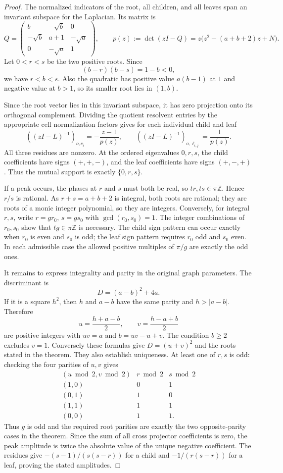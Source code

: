 \documentclass[11pt,a4paper]{article}
\theoremstyle{definition}\newtheorem{definition}[theorem]{Definition}
\theoremstyle{remark}\newtheorem{remark}[theorem]{Remark}
\begin{document}
\begin{proof}
The normalized indicators of the root, all children, and all leaves
span an invariant subspace for the Laplacian. Its matrix is
\[
 Q=\begin{pmatrix}
 b&-\sqrt b&0\\
 -\sqrt b&a+1&-\sqrt a\\
 0&-\sqrt a&1
 \end{pmatrix},\qquad
 p(z):=\det(zI-Q)=z\bigl(z^2-(a+b+2)z+N\bigr).
\]
Let $0<r<s$ be the two positive roots. Since
\[
 (b-r)(b-s)=1-b<0,
\]
we have $r<b<s$. Also the quadratic has positive value $a(b-1)$
at $1$ and negative value at $b>1$, so its smaller root lies in $(1,b)$.

Since the root vector lies in this invariant subspace, it has zero
projection onto its orthogonal complement. Dividing the quotient
resolvent entries by the appropriate cell normalization factors gives
for each individual child and leaf
\[
 ((zI-L)^{-1})_{o,c_i}=-\frac{z-1}{p(z)},\qquad
 ((zI-L)^{-1})_{o,\ell_{i,j}}=\frac1{p(z)}.
\]
All three residues are nonzero. At the ordered eigenvalues $0,r,s$,
the child coefficients have signs $(+,+,-)$, and the leaf coefficients
have signs $(+,-,+)$. Thus the mutual support is exactly $\{0,r,s\}$.

If a peak occurs, the phases at $r$ and $s$ must both be real, so
$tr,ts\in\pi\mathbb Z$. Hence $r/s$ is rational. As $r+s=a+b+2$
is integral, both roots are rational; they are roots of a monic
integer polynomial, so they are integers. Conversely, for integral
$r,s$, write $r=gr_0$, $s=gs_0$ with $\gcd(r_0,s_0)=1$.
The integer combinations of $r_0,s_0$ show that $tg\in\pi\mathbb Z$
is necessary. The child sign pattern can occur exactly when $r_0$
is even and $s_0$ is odd; the leaf sign pattern requires $r_0$ odd and
$s_0$ even. In each admissible case the allowed positive multiples of
$\pi/g$ are exactly the odd ones.

It remains to express integrality and parity in the original graph
parameters. The discriminant is
\[
 D=(a-b)^2+4a.
\]
If it is a square $h^2$, then $h$ and $a-b$ have the same parity and
$h>|a-b|$. Therefore
\[
 u=\frac{h+a-b}{2},\qquad v=\frac{h-a+b}{2}
\]
are positive integers with $uv=a$ and $b=uv-u+v$. The condition
$b\geq2$ excludes $v=1$. Conversely these formulas give
$D=(u+v)^2$ and the roots stated in the theorem. They also establish
uniqueness. At least one of $r,s$ is odd: checking the four parities
of $u,v$ gives
\[
\begin{array}{c|c|c}
(u\bmod2,v\bmod2)&r\bmod2&s\bmod2\\\hline
(1,0)&0&1\\
(0,1)&1&0\\
(1,1)&1&1\\
(0,0)&1&1.
\end{array}
\]
Thus $g$ is odd and the required root parities are exactly the two
opposite-parity cases in the theorem. Since the sum of all cross
projector coefficients is zero, the peak amplitude is twice the
absolute value of the unique negative coefficient. The residues give
$-(s-1)/(s(s-r))$ for a child and $-1/(r(s-r))$ for a leaf, proving
the stated amplitudes.


\end{proof}
\end{document}
